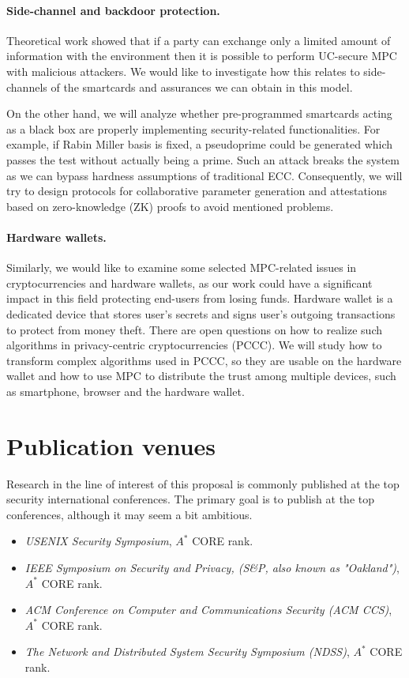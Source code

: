 \documentclass[
  digital, %
  twoside, %
  table,   %
  lof,     %
  lot,     %
]{fithesis3}
\theoremstyle{definition}
\theoremstyle{remark}
\begin{document}
\paragraph{Side-channel and backdoor protection.}%
Theoretical work \cite{DNW09} showed that if a party can exchange only a limited amount of information with the environment then it is possible to perform UC-secure MPC with malicious attackers. We would like to investigate how this relates to side-channels of the smartcards and assurances we can obtain in this model.

On the other hand, we will analyze whether pre-programmed smartcards acting as a black box are properly implementing security-related functionalities. For example, if Rabin Miller basis is fixed, a pseudoprime could be generated which passes the test without actually being a prime. Such an attack breaks the system as we can bypass hardness assumptions of traditional ECC. Consequently, we will try to design protocols for collaborative parameter generation and attestations based on zero-knowledge (ZK) proofs to avoid mentioned problems.

\paragraph{Hardware wallets.}%
Similarly, we would like to examine some selected MPC-related issues in cryptocurrencies and hardware wallets, as our work could have a significant impact in this field protecting end-users from losing funds. 
Hardware wallet is a dedicated device that stores user's secrets and signs user's outgoing transactions to protect from money theft. There are open questions on how to realize such algorithms in privacy-centric cryptocurrencies (PCCC).
We will study how to transform complex algorithms used in PCCC, so they are usable on the hardware wallet and how to use MPC to distribute the trust among multiple devices, such as smartphone, browser and the hardware wallet. 


\section{Publication venues}
Research in the line of interest of this proposal is commonly published at the top security international conferences. The primary goal is to publish at the top conferences, although it may seem a bit ambitious.

\begin{itemize}
	\item \emph{USENIX Security Symposium}, $A^*$ CORE rank.
	
	\item \emph{IEEE Symposium on Security and Privacy, (S\&P, also known as "Oakland")}, $A^*$ CORE rank.
	
	\item \emph{ACM Conference on Computer and Communications Security (ACM CCS)}, $A^*$ CORE rank.
	
	\item \emph{The Network and Distributed System Security Symposium (NDSS)}, $A^*$ CORE rank.
\end{itemize}
\end{document}
